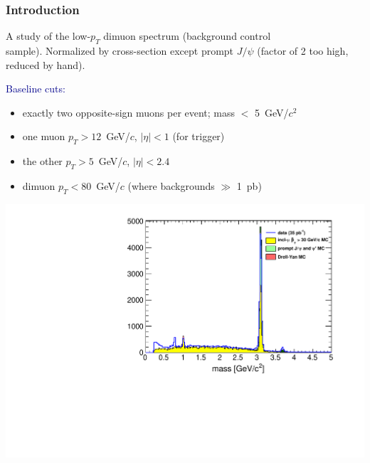 \documentclass[compress]{beamer}
\begin{document}

\small


\begin{frame}
\frametitle{Introduction}

A study of the low-$p_T$ dimuon spectrum (background control \\ sample).  Normalized by cross-section except prompt $J/\psi$ (factor of 2 too high, reduced by hand).

\textcolor{darkblue}{Baseline cuts:}
\begin{itemize}
\item exactly two opposite-sign muons per event; mass $<$ 5~GeV/$c^2$
\item one muon $p_T > 12$~GeV/$c$, $|\eta| < 1$ (for trigger)
\item the other $p_T > 5$~GeV/$c$, $|\eta| < 2.4$
\item dimuon $p_T < 80$~GeV/$c$ (where backgrounds $\gg$ 1~pb)
\end{itemize}

\begin{center}
\includegraphics[width=0.6\linewidth]{lowdimuon_massdistribution.pdf}
\end{center}
\end{frame}
\end{document}
